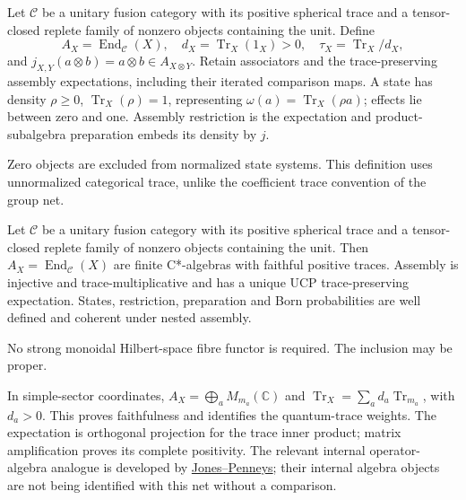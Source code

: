 \begin{definition}
Let $\mathcal C$ be a unitary fusion category with its positive spherical
trace and a tensor-closed replete family of nonzero objects containing
the unit. Define
\[
A_X=\operatorname{End}_{\mathcal C}(X),\quad
d_X=\operatorname{Tr}_X(1_X)>0,\quad
\tau_X=\operatorname{Tr}_X/d_X,
\]
and $j_{X,Y}(a\otimes b)=a\otimes b\in A_{X\otimes Y}$.
Retain associators and the trace-preserving assembly expectations,
including their iterated comparison maps. A state has density
$\rho\geq0$, $\operatorname{Tr}_X(\rho)=1$, representing
$\omega(a)=\operatorname{Tr}_X(\rho a)$; effects lie between zero and one.
Assembly restriction is the expectation and product-subalgebra
preparation embeds its density by $j$.
\end{definition}
\begin{scope}Zero objects are excluded from normalized state systems.
This definition uses unnormalized categorical trace, unlike the coefficient
trace convention of the group net.\end{scope}

\begin{theorem}
{\normalfont\statusProved}\quad Let $\mathcal C$ be a unitary fusion category
with its positive spherical trace and a tensor-closed replete family of
nonzero objects containing the unit. Then $A_X=\operatorname{End}_{\mathcal C}(X)$
are finite C*-algebras with faithful
positive traces. Assembly is injective and trace-multiplicative and has
a unique UCP trace-preserving expectation. States, restriction,
preparation and Born probabilities are well defined and coherent under
nested assembly.
\end{theorem}
\begin{scope}No strong monoidal Hilbert-space fibre functor is required.
The inclusion may be proper.\end{scope}

In simple-sector coordinates,
$A_X=\bigoplus_aM_{m_a}(\mathbb C)$ and
$\operatorname{Tr}_X=\sum_a d_a\operatorname{Tr}_{m_a}$, with $d_a>0$.
This proves faithfulness and identifies the quantum-trace weights.
The expectation is orthogonal projection for the trace inner product;
matrix amplification proves its complete positivity. The relevant
internal operator-algebra analogue is developed by
\href{https://arxiv.org/abs/1611.04620}{Jones--Penneys}; their internal
algebra objects are not being identified with this net without a comparison.


